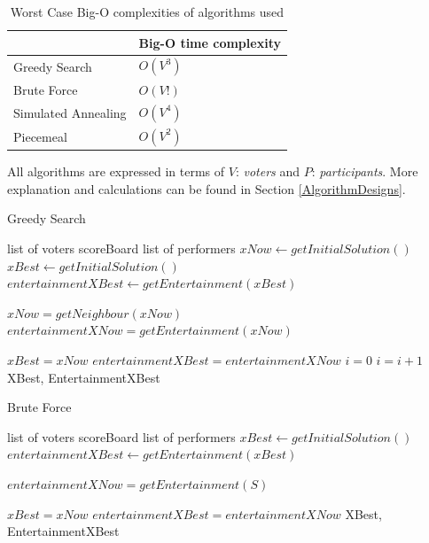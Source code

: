 \documentclass[12pt]{report}
\begin{document}
\begin{table}[H]
\centering
\caption{Worst Case Big-O complexities of algorithms used}
\label{bigO}
\begin{tabular}{|l|l|}
\hline
        & Big-O time complexity \\ \hline
Greedy Search & $O(V^3)$ \\ \hline
Brute Force & $O(V!)$ \\ \hline
Simulated Annealing & $O(V^4)$ \\ \hline
Piecemeal & $O(V^2)$ \\ \hline
\end{tabular}
\end{table}
All algorithms are expressed in terms of $V$: \textit{voters} and $P$: \textit{participants}. More explanation and calculations can be found in Section \ref{AlgorithmDesigns}.

\begin{algorithm}
\caption{Greedy Search}
\label{greedyPseuodocode}
\begin{algorithmic}[1]
\REQUIRE list of voters
\REQUIRE scoreBoard
\REQUIRE list of performers
\STATE $xNow \leftarrow getInitialSolution()$
\STATE $xBest \leftarrow getInitialSolution()$
\STATE $entertainmentXBest \leftarrow getEntertainment(xBest)$

\STATE $xNow = getNeighbour(xNow)$
\STATE $entertainmentXNow = getEntertainment(xNow)$

\STATE $xBest = xNow$
\STATE $entertainmentXBest = entertainmentXNow$
\STATE $i = 0$
\ENDIF
\STATE $i = i + 1$
\ENDWHILE
\RETURN XBest, EntertainmentXBest
\end{algorithmic}
\end{algorithm}

\begin{algorithm}
\caption{Brute Force}
\label{bruteForcePseudocode}
\begin{algorithmic}[1]
\REQUIRE list of voters
\REQUIRE scoreBoard
\REQUIRE list of performers
\STATE $xBest \leftarrow getInitialSolution()$
\STATE $entertainmentXBest \leftarrow getEntertainment(xBest)$

\STATE $entertainmentXNow = getEntertainment(S)$

\STATE $xBest = xNow$
\STATE $entertainmentXBest = entertainmentXNow$
\ENDIF
\ENDFOR
\RETURN XBest, EntertainmentXBest
\end{algorithmic}
\end{algorithm}
\end{document}
